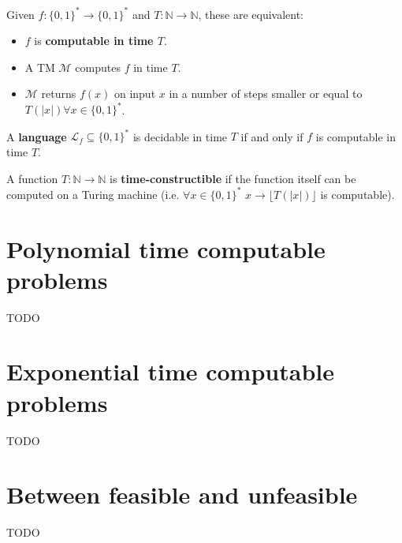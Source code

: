 \documentclass[]{article}
\begin{document}
Given $f:\{0,1\}^* \to \{0,1\}^*$ and $T:\mathbb{N} \to \mathbb{N}$, these are equivalent:
\begin{itemize}
	\item $f$ is \textbf{computable in time $T$}.
	\item A TM $\mathcal{M}$ computes $f$ in time $T$.
	\item $\mathcal{M}$ returns $f(x)$ on input $x$ in a number of steps smaller or equal to $T(|x|) \forall x \in \{0,1\}^*$.
\end{itemize}

A \textbf{language} $\mathcal{L}_{f} \subseteq\{0,1\}^{*}$ is decidable in time $T$ if and only if $f$ is computable in time $T$.

A function $T:\mathbb{N} \to \mathbb{N}$ is \textbf{time-constructible} if the function itself can be computed on a Turing machine (i.e. $\forall x \in \{0,1\}^*$ $x \to \lfloor T(|x|) \rfloor$ is computable).

\section{Polynomial time computable problems}

TODO

\section{Exponential time computable problems}

TODO

\section{Between feasible and unfeasible}

TODO
\end{document}
